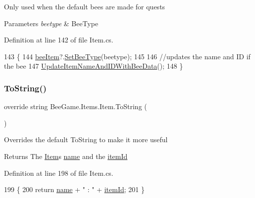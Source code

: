 Only used when the default bees are made for quests 


\begin{DoxyParams}{Parameters}
{\em beetype} & Bee\+Type\\
\hline
\end{DoxyParams}


Definition at line 142 of file Item.\+cs.


\begin{DoxyCode}
143         \{
144             \hyperlink{struct_bee_game_1_1_items_1_1_item_a0593f3b7b3ff5daa864f3c6d0ccd77ca}{beeItem}?.\hyperlink{struct_bee_game_1_1_bee_1_1_bee_data_a3141a8d2ea0b8da9b88fc61dd1134b65}{SetBeeType}(beetype);
145 
146             \textcolor{comment}{//updates the name and ID if the bee}
147             \hyperlink{struct_bee_game_1_1_items_1_1_item_a6ceebb94663dc0cb54e048ec37fab3fa}{UpdateItemNameAndIDWithBeeData}();
148         \}
\end{DoxyCode}
\mbox{\label{struct_bee_game_1_1_items_1_1_item_ac8039eff360bc9120180a54a0aaf13d8}} 
\subsubsection{\texorpdfstring{To\+String()}{ToString()}}
{\footnotesize\ttfamily override string Bee\+Game.\+Items.\+Item.\+To\+String (\begin{DoxyParamCaption}{ }\end{DoxyParamCaption})}



Overrides the default To\+String to make it more useful 

\begin{DoxyReturn}{Returns}
The \hyperlink{struct_bee_game_1_1_items_1_1_item}{Item}\textquotesingle{}s \hyperlink{struct_bee_game_1_1_items_1_1_item_a0b0bd7eb510757f650f1be3d05b23fc8}{name} and the \hyperlink{struct_bee_game_1_1_items_1_1_item_aa85bfeab893271c26f8ca41b638ada1c}{item\+Id}
\end{DoxyReturn}


Definition at line 198 of file Item.\+cs.


\begin{DoxyCode}
199         \{
200             \textcolor{keywordflow}{return} \hyperlink{struct_bee_game_1_1_items_1_1_item_a0b0bd7eb510757f650f1be3d05b23fc8}{name} + \textcolor{stringliteral}{" : "} + \hyperlink{struct_bee_game_1_1_items_1_1_item_aa85bfeab893271c26f8ca41b638ada1c}{itemId};
201         \}
\end{DoxyCode}
\mbox{\label{struct_bee_game_1_1_items_1_1_item_a4bc320f90a3fb06467046eedeb88ed13}} 
